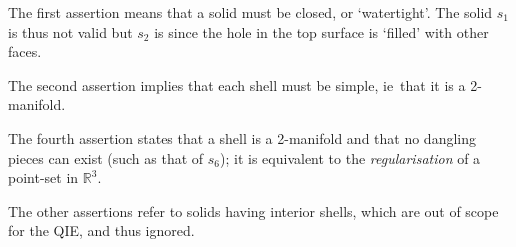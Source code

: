 \documentclass[a4paper,parskip=half,11pt]{scrartcl}
\newcommand{\ie}{ie}
\begin{document}
The first assertion means that a solid must be closed, or `watertight'.
The solid $s_1$ is thus not valid but $s_2$ is since the hole in the top surface is `filled' with other faces.

The second assertion implies that each shell must be simple, \ie\ that it is a 2-manifold.

The fourth assertion states that a shell is a 2-manifold and that no dangling pieces can exist (such as that of $s_6$); it is equivalent to the \emph{regularisation} of a point-set in $\mathbb{R}^3$.

The other assertions refer to solids having interior shells, which are out of scope for the QIE, and thus ignored.





\end{document}
